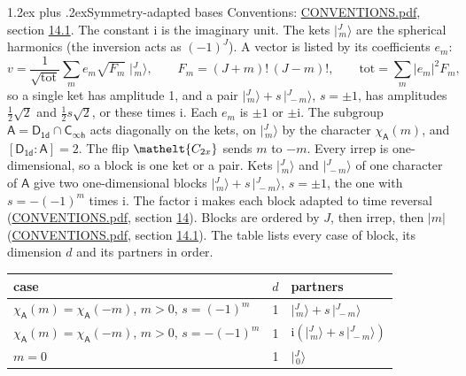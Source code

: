 \documentclass[10pt,a4paper]{article}
\makeatletter
\renewcommand\section{\@startsection{section}{1}{\z@}{-3ex plus -1ex minus -.2ex}%
  {1.2ex plus .2ex}{\normalfont\large\sffamily\bfseries\color{parttitle}}}
\numberwithin{equation}{section}
\newcommand{\eltfont}[1]{{\let\sigma\eltsigma\mathelt{#1}}}
\newcommand{\grp}[1]{\mathsf{#1}}
\newcommand{\elt}[1]{\eltfont{#1}}
\newcommand{\grpindex}[2]{[#1 : #2]}
\newcommand{\iunit}{\mathrm{i}}
\newcommand{\chiA}{\chi_{\grp{A}}}
\newcommand{\jm}[2]{\bigl\lvert{}^{#1}_{\,#2}\bigr\rangle}
\makeatother
\begin{document}
\section{Symmetry-adapted bases}\label{s:bases}
Conventions: \href{../../CONVENTIONS.pdf}{CONVENTIONS.pdf}, section \href{../../CONVENTIONS.pdf\#conv.14.1}{14.1}.
The constant $\iunit$ is the imaginary unit.
\leavevmode\label{n:index.m}\label{n:vector.ket}The kets $\jm{J}{m}$ are the spherical harmonics (the inversion acts as $(-1)^J$). \label{n:index.ketcoefficient}\label{n:vector.basis.symmetry}\label{n:index.ketweight}\label{n:index.total}A vector is listed by its coefficients $e_m$:
\begin{equation}\label{e:ket}v = \frac{1}{\sqrt{\mathrm{tot}}}\sum_m e_m\sqrt{F_m}\;\jm{J}{m},\qquad F_m = (J+m)!\,(J-m)!,\qquad \mathrm{tot} = \sum_m |e_m|^2F_m,\end{equation}
\leavevmode\label{n:index.pair.sign}so a single ket has amplitude 1, and a pair $\jm{J}{m} + s\,\jm{J}{-m}$, $s = \pm1$, has amplitudes $\tfrac{1}{2}\sqrt{2}$ and $\tfrac{1}{2}s\sqrt{2}$, or these times $\iunit$. Each $e_m$ is $\pm1$ or $\pm\iunit$.
\leavevmode\label{n:group.A}\label{n:function.character.abelian}The subgroup $\grp{A} = \grp{D_{1d}}\cap\grp{C_{\infty h}}$ acts diagonally on the kets, on $\jm{J}{m}$ by the character $\chiA(m)$, and $\grpindex{\grp{D_{1d}}}{\grp{A}} = 2$. The flip $\elt{C_{2x}}$ sends $m$ to $-m$. Every irrep is one-dimensional, so a block is one ket or a pair. Kets $\jm{J}{m}$ and $\jm{J}{-m}$ of one character of $\grp{A}$ give two one-dimensional blocks $\jm{J}{m} + s\,\jm{J}{-m}$, $s = \pm1$, the one with $s = -(-1)^m$ times $\iunit$. The factor $\iunit$ makes each block adapted to time reversal (\href{../../CONVENTIONS.pdf}{CONVENTIONS.pdf}, section \href{../../CONVENTIONS.pdf\#conv.14}{14}). Blocks are ordered by $J$, then irrep, then $|m|$ (\href{../../CONVENTIONS.pdf}{CONVENTIONS.pdf}, section \href{../../CONVENTIONS.pdf\#conv.14.1}{14.1}).
\leavevmode\label{n:head.case}\label{n:head.partners}The table lists every case of block, its dimension $d$ and its partners in order.
\begin{center}\begin{tabular}{@{}lrl@{}}\toprule
case & $d$ & partners\\\midrule
$\chiA(m) = \chiA(-m)$, $m > 0$, $s = (-1)^m$ & 1 & $\jm{J}{m} + s\,\jm{J}{-m}$\\
$\chiA(m) = \chiA(-m)$, $m > 0$, $s = -(-1)^m$ & 1 & $\iunit(\jm{J}{m} + s\,\jm{J}{-m})$\\
$m = 0$ & 1 & $\jm{J}{0}$\\
\bottomrule\end{tabular}\end{center}
\end{document}
